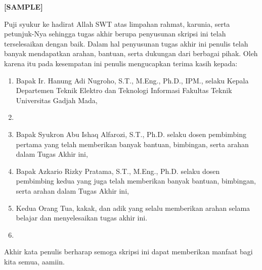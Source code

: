 \begin{center}
	\textbf{[SAMPLE]}
\end{center}

Puji syukur ke hadirat Allah SWT atas limpahan rahmat, karunia, serta petunjuk-Nya sehingga tugas akhir berupa penyusunan skripsi ini telah terselesaikan dengan baik. Dalam hal penyusunan tugas akhir ini penulis telah banyak mendapatkan arahan, bantuan, serta dukungan dari berbagai pihak. Oleh karena itu pada kesempatan ini penulis mengucapkan terima kasih kepada:

\begin{enumerate}
	\item Bapak Ir. Hanung Adi Nugroho, S.T., M.Eng., Ph.D., IPM., selaku Kepala Departemen Teknik Elektro dan Teknologi Informasi Fakultas Teknik Universitas Gadjah Mada,
	
	\item <isi dengan nama Sekdep>
	
	\item Bapak Syukron Abu Ishaq Alfarozi, S.T., Ph.D. selaku dosen pembimbing pertama yang telah memberikan banyak bantuan, bimbingan, serta arahan dalam Tugas Akhir ini,

	\item Bapak Azkario Rizky Pratama, S.T., M.Eng., Ph.D. selaku dosen pembimbing kedua yang juga telah memberikan banyak bantuan, bimbingan, serta arahan dalam Tugas Akhir ini,
	
	\item Kedua Orang Tua, kakak, dan adik yang selalu memberikan arahan selama belajar dan menyelesaikan tugas akhir ini. 
	
	\item <isi dengan nama orang lainnya>

\end{enumerate}

Akhir kata penulis berharap semoga skripsi ini dapat memberikan manfaat bagi kita semua, aamiin.

